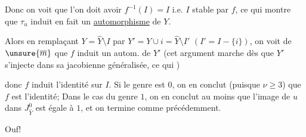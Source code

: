 

 Donc on voit que l'on doit avoir $f^{-1}(I)=I$ i.e. $I$ stable par $f$, ce qui montre que $\tau_u$ induit en fait un \uline{automorphisme} de $Y$.


Alors en remplaçant $Y=\widehat Y\setminus I$ par $Y'=Y\cup i=\widehat Y\setminus I'$ $(I'=I-\{i\})$, on voit de $\unsure{\overline m}$ que $f$ induit un autom. de $Y'$ (cet argument marche dès que $Y'$ s'injecte dans sa jacobienne généralisée, ce qui  )

 donc $f$ induit l'identité sur $I$. Si le genre est $0$, on en conclut (puisque $\nu\geq3$) que $f$ est l'identité;  Dans le cas du genre $1$, on en conclut au moins que l'image de $u$ dans $J_{\widehat Y}^0$ est égale à $1$, et on termine comme précédemment.

Ouf!
